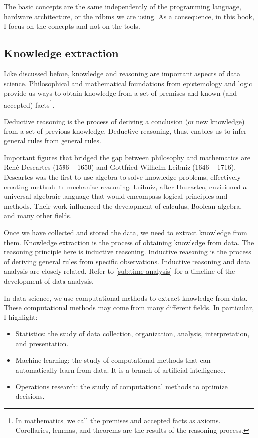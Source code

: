 The basic concepts are the same independently of the programming language, hardware
architecture, or the \gls{rdbms} we are using.  As a consequence, in this book, I focus on
the concepts and not on the tools.

\subsection{Knowledge extraction}
\label{sub:knowledge}

Like discussed before, knowledge and reasoning are important aspects of data science.
Philosophical and mathematical foundations from epistemology and logic provide us ways
to obtain knowledge from a set of premises and known (and accepted) facts\footnote{In
mathematics, we call the premises and accepted facts as axioms.  Corollaries,
lemmas, and theorems are the results of the reasoning process.}.

Deductive reasoning is the process of deriving a conclusion (or new knowledge) from
a set of previous knowledge.  Deductive reasoning, thus, enables us to infer general
rules from general rules.

Important figures that bridged the gap between philosophy and mathematics are
René Descartes (1596 -- 1650) and Gottfried Wilhelm Leibniz (1646 -- 1716).  Descartes
was the first to use algebra to solve knowledge problems, effectively creating
methods to mechanize reasoning.  Leibniz, after Descartes, envisioned a universal
algebraic language that would emcompass logical principles and methods. Their work
influenced the development of calculus, Boolean algebra, and many other fields.

Once we have collected and stored the data, we need to extract knowledge from them.
Knowledge extraction is the process of obtaining knowledge from data.  The reasoning
principle here is inductive reasoning.  Inductive reasoning is the process of deriving
general rules from specific observations.  Inductive reasoning and data analysis
are closely related.  Refer to \cref{sub:time-analysis} for a timeline of the development
of data analysis.

In data science, we use computational methods to extract knowledge from data.  These
computational methods may come from many different fields.  In particular, I highlight:
\begin{itemize}
  \itemsep0em
  \item Statistics: the study of data collection, organization, analysis, interpretation,
    and presentation.
  \item Machine learning: the study of computational methods that can automatically learn from data.
    It is a branch of artificial intelligence.
  \item Operations research: the study of computational methods to optimize decisions.
\end{itemize}

